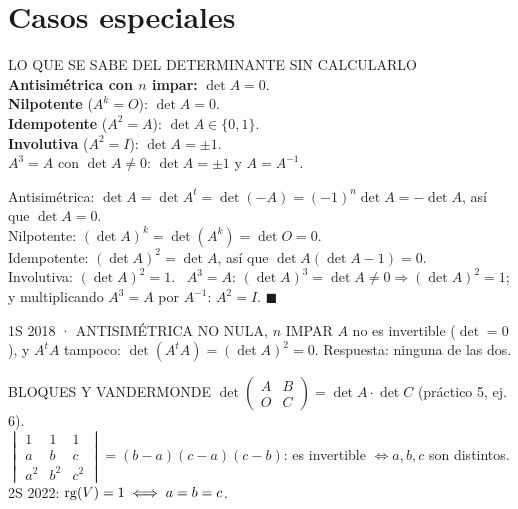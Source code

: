 \section{Casos especiales}
\begin{sello}{LO QUE SE SABE DEL DETERMINANTE SIN CALCULARLO}
\textbf{Antisimétrica con $n$ impar:} $\det A=0$.\\
\textbf{Nilpotente} ($A^k=O$): $\det A=0$.\\
\textbf{Idempotente} ($A^2=A$): $\det A\in\{0,1\}$.\\
\textbf{Involutiva} ($A^2=I$): $\det A=\pm1$.\\
$A^3=A$ con $\det A\neq0$: $\det A=\pm1$ y $A=A^{-1}$.
\end{sello}
\begin{demo}
Antisimétrica: $\det A=\det A^t=\det(-A)=(-1)^n\det A=-\det A$, así que $\det A=0$.\\
Nilpotente: $(\det A)^k=\det(A^k)=\det O=0$.\\
Idempotente: $(\det A)^2=\det A$, así que $\det A(\det A-1)=0$.\\
Involutiva: $(\det A)^2=1$. \ $A^3=A$: $(\det A)^3=\det A\neq0\Rightarrow(\det A)^2=1$; y multiplicando $A^3=A$ por $A^{-1}$: $A^2=I$. $\blacksquare$
\end{demo}
\begin{memo}{1S 2018 · ANTISIMÉTRICA NO NULA, $n$ IMPAR}
$A$ no es invertible ($\det=0$), y $A^tA$ tampoco: $\det(A^tA)=(\det A)^2=0$. Respuesta: ninguna de las dos.
\end{memo}
\begin{sello}{BLOQUES Y VANDERMONDE}
$\det\begin{pmatrix}A&B\\O&C\end{pmatrix}=\det A\cdot\det C$ \quad (práctico 5, ej. 6).\\[3pt]
$\begin{vmatrix}1&1&1\\a&b&c\\a^2&b^2&c^2\end{vmatrix}=(b-a)(c-a)(c-b)$: es invertible $\iff a,b,c$ son distintos.\\
2S 2022: $\operatorname{rg}(V)=1\iff a=b=c$.
\end{sello}


